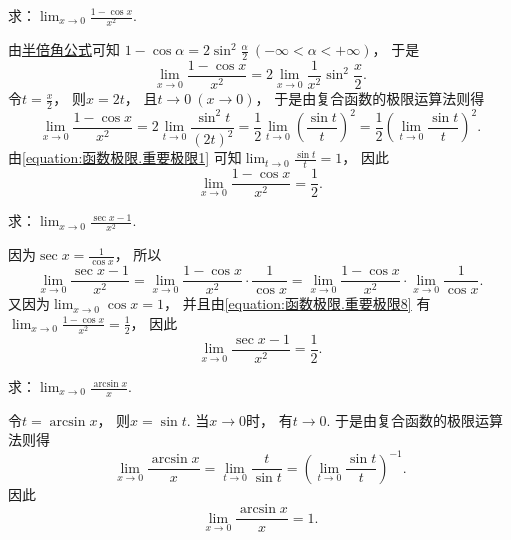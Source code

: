 \begin{example}
求：\(\lim_{x\to0} \frac{1-\cos x}{x^2}\).
\begin{solution}
由\hyperref[equation:三角函数.正弦的半倍角公式]{半倍角公式}可知
\(1 - \cos\alpha = 2\sin^2\frac\alpha2\ (-\infty<\alpha<+\infty)\)，
于是\[
	\lim_{x\to0} \frac{1-\cos x}{x^2}
	= 2 \lim_{x\to0} \frac1{x^2} \sin^2\frac{x}2.
\]
令\(t=\frac{x}2\)，
则\(x=2t\)，
且\(t\to0\ (x\to0)\)，
于是由复合函数的极限运算法则得\[
	\lim_{x\to0} \frac{1-\cos x}{x^2}
	= 2 \lim_{t\to0} \frac{\sin^2 t}{(2t)^2}
	= \frac12 \lim_{t\to0} \left(\frac{\sin t}{t}\right)^2
	= \frac12 \left(\lim_{t\to0} \frac{\sin t}{t}\right)^2.
\]
由\cref{equation:函数极限.重要极限1} 可知\(\lim_{t\to0} \frac{\sin t}{t} = 1\)，
因此\begin{equation}\label{equation:函数极限.重要极限8}
	\lim_{x\to0} \frac{1-\cos x}{x^2} = \frac12.
\end{equation}
\end{solution}
\end{example}

\begin{example}
求：\(\lim_{x\to0} \frac{\sec x-1}{x^2}\).
\begin{solution}
因为\(\sec x = \frac1{\cos x}\)，
所以\[
	\lim_{x\to0} \frac{\sec x-1}{x^2}
	= \lim_{x\to0} \frac{1-\cos x}{x^2} \cdot \frac1{\cos x}
	= \lim_{x\to0} \frac{1-\cos x}{x^2} \cdot \lim_{x\to0} \frac1{\cos x}.
\]
又因为\(\lim_{x\to0} \cos x = 1\)，
并且由\cref{equation:函数极限.重要极限8} 有
\(\lim_{x\to0} \frac{1-\cos x}{x^2} = \frac12\)，
因此\begin{equation}\label{equation:函数极限.重要极限15}
	\lim_{x\to0} \frac{\sec x-1}{x^2} = \frac12.
\end{equation}
\end{solution}
\end{example}

\begin{example}
求：\(\lim_{x\to0} \frac{\arcsin x}{x}\).
\begin{solution}
令\(t = \arcsin x\)，
则\(x = \sin t\).
当\(x\to0\)时，
有\(t\to0\).
于是由复合函数的极限运算法则得\[
	\lim_{x\to0} \frac{\arcsin x}{x}
	= \lim_{t\to0} \frac{t}{\sin t}
	= \left(\lim_{t\to0} \frac{\sin t}{t}\right)^{-1}.
\]
因此\begin{equation}\label{equation:函数极限.重要极限9}
	\lim_{x\to0} \frac{\arcsin x}{x} = 1.
\end{equation}
\end{solution}
\end{example}


